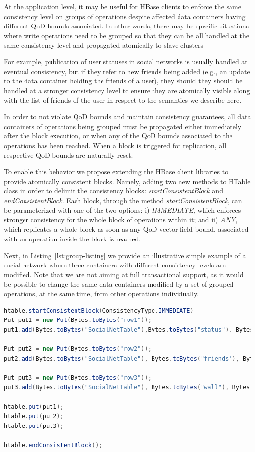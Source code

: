At the application level, it may be useful for HBase clients to enforce the same consistency level on groups of operations despite affected data containers having different QoD bounds associated. In other words, there may be specific situations where write operations need to be grouped so that they can be all handled at the same consistency level and propagated atomically to slave clusters. 

For example, publication of user statuses in social networks is usually handled at eventual consistency, but if they refer to new friends being added (e.g., an update to the data container holding the friends of a user), they should they should be handled at a stronger consistency level to ensure they are atomically visible along with the list of friends of the user in respect to the semantics we describe here.

In order to not violate QoD bounds and maintain consistency guarantees, all data containers of operations being grouped must be propagated either immediately after the block execution, or when any of the QoD bounds associated to the operations has been reached. When a block is triggered for replication, all respective QoD bounds are naturally reset. 

To enable this behavior we propose extending the HBase client libraries to provide atomically consistent blocks.
Namely, adding two new methods to HTable class in order to delimit the consistency blocks: \textit{startConsistentBlock} and \textit{endConsistentBlock}. Each block, through the method \textit{startConsistentBlock}, can be parameterized with one of the two options: i) \textit{IMMEDIATE}, which enforces stronger consistency for the whole block of operations within it; and ii) \textit{ANY}, which replicates a whole block as soon as any QoD vector field bound, associated with an operation inside the block is reached.

Next, in Listing~\ref{lst:group-listing} we provide an illustrative simple example of a social network where three containers with different consistency levels are modified. Note that we are not aiming at full transactional support, as it would be possible to change the same data containers modified by a set of grouped operations, at the same time, from other operations individually.

\begin{lstlisting}[language={java}, caption={Operation grouping},label={lst:group-listing}]
htable.startConsistentBlock(ConsistencyType.IMMEDIATE)
Put put1 = new Put(Bytes.toBytes("row1"));
put1.add(Bytes.toBytes("SocialNetTable"),Bytes.toBytes("status"), Bytes.toBytes("friend 12345 added"));

Put put2 = new Put(Bytes.toBytes("row2"));
put2.add(Bytes.toBytes("SocialNetTable"), Bytes.toBytes("friends"), Bytes.toBytes("12345"));

Put put3 = new Put(Bytes.toBytes("row3"));
put3.add(Bytes.toBytes("SocialNetTable"), Bytes.toBytes("wall"), Bytes.toBytes("12345 is now a friend"));

htable.put(put1);
htable.put(put2);
htable.put(put3);

htable.endConsistentBlock();
\end{lstlisting}

